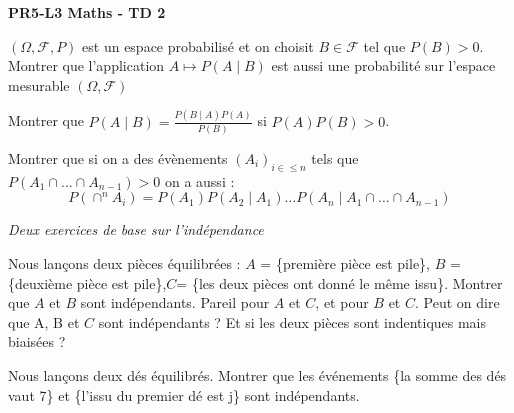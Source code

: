 \documentclass{report}
\begin{document}
\begin{center}
    \Huge{\textbf{PR5-L3 Maths - TD 2}}
\end{center}
\bigskip

\begin{exo}
    \(\left(\Omega, \mathcal{F},P\right)\) est un espace probabilisé et on choisit
    \(B\in\mathcal{F}\) tel que \(P(B)>0\). Montrer que l'application \(A\mapsto
    P(A\mid B)\) est aussi une probabilité sur l'espace mesurable \(\left(\Omega,
    \mathcal{F}\right)\)
\end{exo}

\begin{exo}
    Montrer que \(P(A\mid B)= \frac{P(B\mid A)P(A)}{P(B)}\) si \(P(A)P(B)>0\).
\end{exo}

\begin{exo}
    Montrer que si on a des évènements \(\left(A_i\right)_{i\in\leq n}\) tels
    que \(P(A_1\cap...\cap A_{n-1})>0\) on a aussi :
    \[P\left(\cap^n A_i\right) = P(A_1)P(A_2\mid A_1)\dots
    P(A_n \mid A_1\cap\dots\cap A_{n-1})\]
\end{exo}

\begin{exo}
    \textit{Deux exercices de base sur l'indépendance}
    \begin{q}{1}
        Nous lançons deux pièces équilibrées : \(A\) = \{première pièce est pile\},
        \(B\) = \{deuxième pièce est pile\},\(C\)= \{les deux pièces ont donné le même
        issu\}. Montrer que \(A\) et \(B\) sont indépendants. Pareil pour \(A\) et
        \(C\), et pour \(B\) et \(C\). Peut on dire que A, B et \(C\) sont
        indépendants ? Et si les deux pièces sont indentiques mais biaisées ?
    \end{q}
    \begin{q}{2}
        Nous lançons deux dés équilibrés. Montrer que les événements \{la somme
        des dés vaut 7\} et \{l'issu du premier dé est j\} sont indépendants.
    \end{q}
\end{exo}
\end{document}
